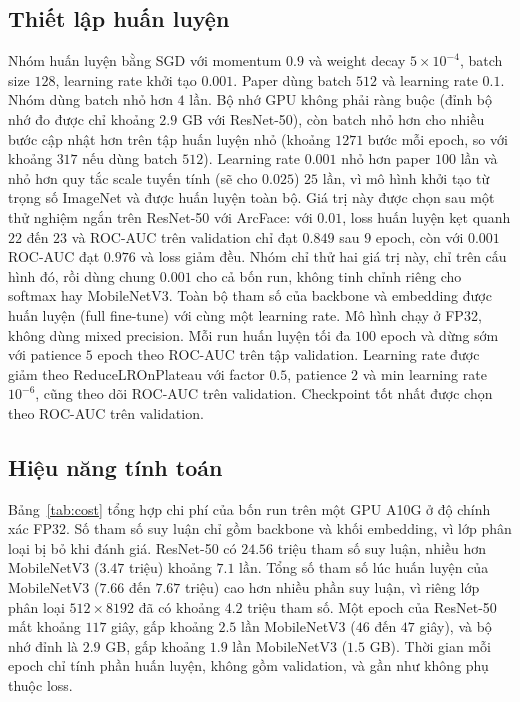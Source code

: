 \documentclass[a4paper,12pt]{article}
\begin{document}
\subsection{Thiết lập huấn luyện}
Nhóm huấn luyện bằng SGD với momentum $0.9$ và weight decay $5 \times 10^{-4}$, batch size $128$, learning rate khởi tạo $0.001$. Paper dùng batch $512$ và learning rate $0.1$. Nhóm dùng batch nhỏ hơn $4$ lần. Bộ nhớ GPU không phải ràng buộc (đỉnh bộ nhớ đo được chỉ khoảng $2.9$ GB với ResNet-50), còn batch nhỏ hơn cho nhiều bước cập nhật hơn trên tập huấn luyện nhỏ (khoảng $1271$ bước mỗi epoch, so với khoảng $317$ nếu dùng batch $512$). Learning rate $0.001$ nhỏ hơn paper $100$ lần và nhỏ hơn quy tắc scale tuyến tính (sẽ cho $0.025$) $25$ lần, vì mô hình khởi tạo từ trọng số ImageNet và được huấn luyện toàn bộ. Giá trị này được chọn sau một thử nghiệm ngắn trên ResNet-50 với ArcFace: với $0.01$, loss huấn luyện kẹt quanh $22$ đến $23$ và ROC-AUC trên validation chỉ đạt $0.849$ sau $9$ epoch, còn với $0.001$ ROC-AUC đạt $0.976$ và loss giảm đều. Nhóm chỉ thử hai giá trị này, chỉ trên cấu hình đó, rồi dùng chung $0.001$ cho cả bốn run, không tinh chỉnh riêng cho softmax hay MobileNetV3. Toàn bộ tham số của backbone và embedding được huấn luyện (full fine-tune) với cùng một learning rate. Mô hình chạy ở FP32, không dùng mixed precision. Mỗi run huấn luyện tối đa $100$ epoch và dừng sớm với patience $5$ epoch theo ROC-AUC trên tập validation. Learning rate được giảm theo ReduceLROnPlateau với factor $0.5$, patience $2$ và min learning rate $10^{-6}$, cũng theo dõi ROC-AUC trên validation. Checkpoint tốt nhất được chọn theo ROC-AUC trên validation.

\subsection{Hiệu năng tính toán}
Bảng~\ref{tab:cost} tổng hợp chi phí của bốn run trên một GPU A10G ở độ chính xác FP32. Số tham số suy luận chỉ gồm backbone và khối embedding, vì lớp phân loại bị bỏ khi đánh giá. ResNet-50 có $24.56$ triệu tham số suy luận, nhiều hơn MobileNetV3 ($3.47$ triệu) khoảng $7.1$ lần. Tổng số tham số lúc huấn luyện của MobileNetV3 ($7.66$ đến $7.67$ triệu) cao hơn nhiều phần suy luận, vì riêng lớp phân loại $512 \times 8192$ đã có khoảng $4.2$ triệu tham số. Một epoch của ResNet-50 mất khoảng $117$ giây, gấp khoảng $2.5$ lần MobileNetV3 ($46$ đến $47$ giây), và bộ nhớ đỉnh là $2.9$ GB, gấp khoảng $1.9$ lần MobileNetV3 ($1.5$ GB). Thời gian mỗi epoch chỉ tính phần huấn luyện, không gồm validation, và gần như không phụ thuộc loss.
\end{document}
